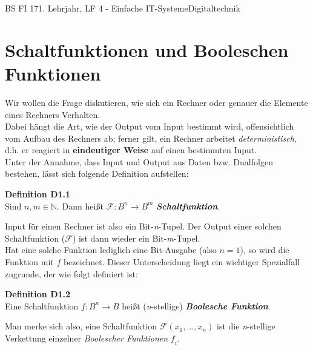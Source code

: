 \documentclass[11pt,twocolumn,oneside,openany,headings=optiontotoc,11pt,numbers=noenddot]{article}
\begin{document}
	\begin{worksheet}{BS FI 17}{1. Lehrjahr, LF 4 - Einfache IT-Systeme}{Digitaltechnik}
		\section{Schaltfunktionen und Booleschen Funktionen}
		Wir wollen die Frage diskutieren, wie sich ein Rechner oder genauer die Elemente eines Rechners Verhalten.\\
		Dabei hängt die Art, wie der Output vom Input bestimmt wird, offensichtlich vom Aufbau des Rechners ab; ferner gilt, ein Rechner arbeitet \textit{deterministisch}, d.h. er reagiert in \textbf{eindeutiger Weise} auf einen bestimmten Input.\\
		Unter der Annahme, dass Input und  Output aus Daten bzw. Dualfolgen bestehen, lässt sich folgende Definition aufstellen:
		\begin{framed}
			\textbf{Definition D1.1}\\Sind \(n,m \in \mathbb{N}\). Dann heißt
			\(\mathcal{F}: B^n \rightarrow B^m\) \textit{\textbf{Schaltfunktion}}.
		\end{framed}
		\noindent
		Input für einen Rechner ist also ein Bit-\textit{n}-Tupel. Der Output einer solchen Schaltfunktion (\(\mathcal{F}\)) ist dann wieder ein Bit-\textit{m}-Tupel.\\
		Hat eine solche Funktion lediglich eine Bit-Ausgabe (also \(n = 1\)), so wird die Funktion mit \(\mathit{f}\) bezeichnet. Dieser Unterscheidung liegt ein wichtiger Spezialfall zugrunde, der wie folgt definiert ist:
		\begin{framed}
			\textbf{Definition D1.2}\\Eine Schaltfunktion \(\mathit{f}: B^n \rightarrow B\)
			heißt (\textit{n}-stellige) \textit{\textbf{Boolesche Funktion}}.
		\end{framed}
		Man merke sich also, eine Schaltfunktion \(\mathcal{F}(x_1,...,x_n)\) ist die \textit{n}-stellige Verkettung einzelner \textit{Boolescher Funktionen} \(\mathit{f}_i\).

\end{worksheet}
\end{document}
